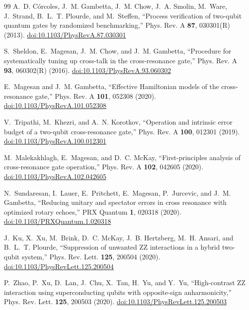 \documentclass[11pt,a4paper]{article}
\begin{document}
\begin{thebibliography}{99}
A.~D. C\'orcoles, J.~M. Gambetta, J.~M. Chow, J.~A. Smolin, M.~Ware, J.~Strand, B.~L.~T. Plourde, and M.~Steffen,
``Process verification of two-qubit quantum gates by randomized benchmarking,'' Phys. Rev. A \textbf{87}, 030301(R)
(2013). \href{https://doi.org/10.1103/PhysRevA.87.030301}{doi:10.1103/PhysRevA.87.030301}

S.~Sheldon, E.~Magesan, J.~M. Chow, and J.~M. Gambetta, ``Procedure for systematically tuning up cross-talk in the
cross-resonance gate,'' Phys. Rev. A \textbf{93}, 060302(R) (2016).
\href{https://doi.org/10.1103/PhysRevA.93.060302}{doi:10.1103/PhysRevA.93.060302}

E.~Magesan and J.~M. Gambetta, ``Effective Hamiltonian models of the cross-resonance gate,'' Phys. Rev. A
\textbf{101}, 052308 (2020). \href{https://doi.org/10.1103/PhysRevA.101.052308}{doi:10.1103/PhysRevA.101.052308}

V.~Tripathi, M.~Khezri, and A.~N. Korotkov, ``Operation and intrinsic error budget of a two-qubit cross-resonance
gate,'' Phys. Rev. A \textbf{100}, 012301 (2019).
\href{https://doi.org/10.1103/PhysRevA.100.012301}{doi:10.1103/PhysRevA.100.012301}

M.~Malekakhlagh, E.~Magesan, and D.~C. McKay, ``First-principles analysis of cross-resonance gate operation,''
Phys. Rev. A \textbf{102}, 042605 (2020). \href{https://doi.org/10.1103/PhysRevA.102.042605}{doi:10.1103/PhysRevA.102.042605}

N.~Sundaresan, I.~Lauer, E.~Pritchett, E.~Magesan, P.~Jurcevic, and J.~M. Gambetta, ``Reducing unitary and spectator
errors in cross resonance with optimized rotary echoes,'' PRX Quantum \textbf{1}, 020318 (2020).
\href{https://doi.org/10.1103/PRXQuantum.1.020318}{doi:10.1103/PRXQuantum.1.020318}

J.~Ku, X.~Xu, M.~Brink, D.~C. McKay, J.~B. Hertzberg, M.~H. Ansari, and B.~L.~T. Plourde, ``Suppression of unwanted
ZZ interactions in a hybrid two-qubit system,'' Phys. Rev. Lett. \textbf{125}, 200504 (2020).
\href{https://doi.org/10.1103/PhysRevLett.125.200504}{doi:10.1103/PhysRevLett.125.200504}

P.~Zhao, P.~Xu, D.~Lan, J.~Chu, X.~Tan, H.~Yu, and Y.~Yu, ``High-contrast ZZ interaction using superconducting qubits
with opposite-sign anharmonicity,'' Phys. Rev. Lett. \textbf{125}, 200503 (2020).
\href{https://doi.org/10.1103/PhysRevLett.125.200503}{doi:10.1103/PhysRevLett.125.200503}


\end{thebibliography}
\end{document}
